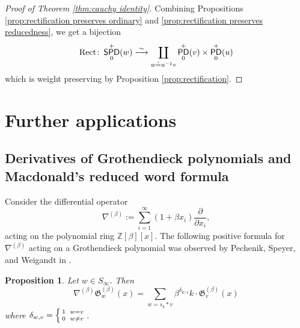 \documentclass[11pt,reqno]{amsart} %
\newcommand{\bbZ}{\mathbb{Z}}
\newcommand{\frakG}{\mathfrak{G}}
\DeclareMathOperator{\PD}{\sf{PD}}
\DeclareMathOperator{\SPD}{\sf{SPD}}
\DeclareMathOperator{\Rect}{Rect} %
\newtheorem{proposition}[theorem]{Proposition}
\theoremstyle{definition}
\begin{document}
\begin{proof}[Proof of Theorem \ref{thm:cauchy identity}]
Combining Propositions \ref{prop:rectification preserves ordinary} and \ref{prop:rectification preserves reducedness},
we get a bijection \[
    \Rect\colon \SPD^+_0(w)
    \overset\sim\longrightarrow
    \coprod_{
        w\doteq u^{-1}v
    } \PD^+_0(v) \times \PD^+_0(u)
\] which is weight preserving by Proposition \ref{prop:rectification}.
\end{proof}



\section{Further applications}
\label{sect:applications}

\subsection{Derivatives of Grothendieck polynomials and Macdonald's reduced word formula}
\label{subsect:nabla identities}

Consider the differential operator \[
    \nabla^{(\beta)} := 
    \sum_{i=1}^\infty (1+\beta x_i) \frac\partial{\partial x_i},
\] acting on the polynomial ring $\bbZ[\beta][x]$.
The following positive formula for $\nabla^{(\beta)}$ acting on a Grothendieck polynomial was observed by Pechenik, Speyer, and Weigandt in \cite{HamakerPechenikSpeyerWeigandt20}.
\begin{proposition}
\label{prop:K-nabla identity}
Let $w\in S_\infty$. Then \[
    \nabla^{(\beta)} \frakG_w^{(\beta)}(x)
    = \sum_{
        w = s_k*v
    }
    \beta^{\delta_{w,v}}k\cdot \frakG_v^{(\beta)}(x)
\] where $\delta_{w,v} =
\left\{\begin{smallmatrix}
    1 & & w=v \vspace{2pt}\\
    0 & & w\neq v
\end{smallmatrix}\right.$.
\end{proposition}
\end{document}
